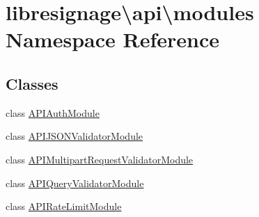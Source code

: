 \hypertarget{namespacelibresignage_1_1api_1_1modules}{}\section{libresignage\textbackslash{}api\textbackslash{}modules Namespace Reference}
\label{namespacelibresignage_1_1api_1_1modules}
\subsection*{Classes}
\begin{DoxyCompactItemize}
\item 
class \hyperlink{classlibresignage_1_1api_1_1modules_1_1APIAuthModule}{A\+P\+I\+Auth\+Module}
\item 
class \hyperlink{classlibresignage_1_1api_1_1modules_1_1APIJSONValidatorModule}{A\+P\+I\+J\+S\+O\+N\+Validator\+Module}
\item 
class \hyperlink{classlibresignage_1_1api_1_1modules_1_1APIMultipartRequestValidatorModule}{A\+P\+I\+Multipart\+Request\+Validator\+Module}
\item 
class \hyperlink{classlibresignage_1_1api_1_1modules_1_1APIQueryValidatorModule}{A\+P\+I\+Query\+Validator\+Module}
\item 
class \hyperlink{classlibresignage_1_1api_1_1modules_1_1APIRateLimitModule}{A\+P\+I\+Rate\+Limit\+Module}
\end{DoxyCompactItemize}
